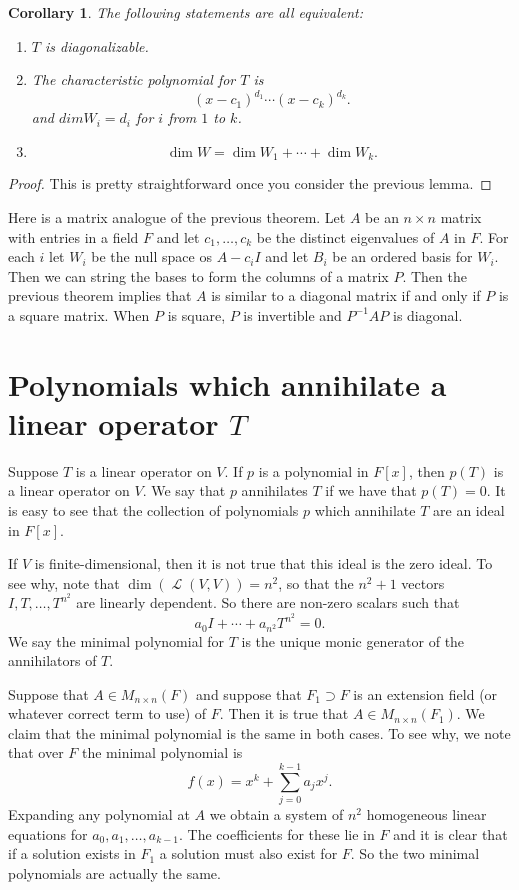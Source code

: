 \documentclass[12pt]{article}
\theoremstyle{plain}
\newtheorem{cor}{Corollary}
\theoremstyle{definition}
\newcommand{\Lop}{\operatorname{\mathcal{L}}}
\begin{document}
\begin{cor}
The following statements are all equivalent:
\begin{enumerate}
	\item $T$ is diagonalizable.
	\item The characteristic polynomial for $T$ is 
	\[ (x - c_1)^{d_1}\cdots(x - c_k)^{d_k}.\]
	and $dim{W_i} = d_i$ for $i$ from $1$ to $k$.
	\item \[\dim{W} = \dim{W_1} + \cdots + \dim{W_k}.\]
\end{enumerate}
\end{cor}
\begin{proof}
This is pretty straightforward once you consider the previous lemma.
\end{proof}

Here is a matrix analogue of the previous theorem. Let $A$ be an $n \times n$ matrix with entries in a field $F$ and let $c_1, \dotsc, c_k$ be the distinct eigenvalues of $A$ in $F$. For each $i$ let $W_i$ be the null space os $A - c_iI$ and let $B_i$ be an ordered basis for $W_i$. Then we can string the bases to form the columns of a matrix $P$. Then the previous theorem implies that $A$ is similar to a diagonal matrix if and only if $P$ is a square matrix. When $P$ is square, $P$ is invertible and $P^{-1}AP$ is diagonal.

\section{Polynomials which annihilate a linear operator $T$}

Suppose $T$ is a linear operator on $V$. If $p$ is a polynomial in $F[x]$, then $p(T)$ is a linear operator on $V$. We say that $p$ annihilates $T$ if we have that $p(T) = 0$. It is easy to see that the collection of polynomials $p$ which annihilate $T$ are an ideal in $F[x]$.

If $V$ is finite-dimensional, then it is not true that this ideal is the zero ideal. To see why, note that $\dim(\Lop(V, V)) = n^2$, so that the $n^2 + 1$ vectors $I, T, \dotsc, T^{n^2}$ are linearly dependent. So there are non-zero scalars such that
\[a_0I + \cdots + a_{n^2}T^{n^2} = 0.\]
We say the minimal polynomial for $T$ is the unique monic generator of the annihilators of $T$.

Suppose that $A \in M_{n \times n}(F)$ and suppose that $F_1 \supset F$ is an extension field (or whatever correct term to use) of $F$. Then it is true that $A \in M_{n \times n}(F_1)$. We claim that the minimal polynomial is the same in both cases. To see why, we note that over $F$ the minimal polynomial is 
\[f(x) = x^k + \sum_{j = 0}^{k - 1}a_jx^j.\] Expanding any polynomial at $A$ we obtain a system of $n^2$ homogeneous linear equations for $a_0, a_1, \dotsc, a_{k - 1}$. The coefficients for these lie in $F$ and it is clear that if a solution exists in $F_1$ a solution must also exist for $F$. So the two minimal polynomials are actually the same.
\end{document}
